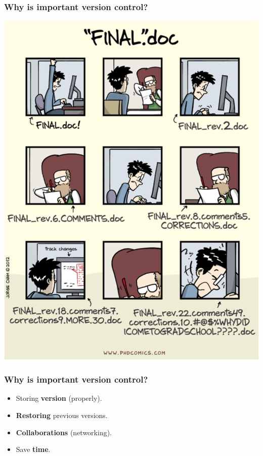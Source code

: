 \documentclass[svgnames]{beamer}
\begin{document}
\begin{frame}
    \frametitle{Why is important version control?}
    \begin{center}
        \includegraphics[scale=0.29]{img/phd_comics.png}
    \end{center}
\end{frame}


\begin{frame}
    \frametitle{Why is important version control?}
    \begin{itemize}
        \item Storing \textbf{version} (properly). \hfill \break
        \item \textbf{Restoring} previous versions. \hfill \break
        \item \textbf{Collaborations} (networking). \hfill \break
        \item Save \textbf{time}. \hfill \break
    \end{itemize}
\end{frame}
\end{document}

